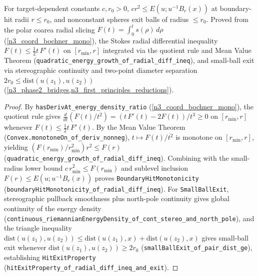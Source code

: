 \begin{theorem}
\label{cert_hit}
\leanok
{}
For target-dependent constants $c,r_0>0$, $cr^2\le E(u;u^{-1}B_r(x))$ at boundary-hit radii $r\le r_0$,
and nonconstant spheres exit balls of radius $\le r_0$. Proved from the polar coarea radial slicing
$F(t)=\int_0^t s(\rho)\,d\rho$ (\cref{n3_coord_bochner_mono}), the Stokes radial differential inequality
$F(t)\le \tfrac12 t\,F'(t)$ on $[r_{\min},r]$ integrated via the quotient rule and Mean Value Theorem
(\texttt{quadratic\_energy\_growth\_of\_radial\_diff\_ineq}), and small-ball exit via stereographic
continuity and two-point diameter separation $2r_0\le \mathrm{dist}(u(z_1),u(z_2))$
(\cref{n3_phase2_bridges,n3_first_principles_reductions}).
\end{theorem}
\begin{proof}\leanok
By \texttt{hasDerivAt\_energy\_density\_ratio} (\cref{n3_coord_bochner_mono}), the quotient rule gives
$\frac{d}{dt}(F(t)/t^2) = (t\,F'(t) - 2F(t))/t^3 \ge 0$ on $[r_{\min},r]$ whenever
$F(t)\le \tfrac12 t\,F'(t)$. By the Mean Value Theorem (\texttt{Convex.monotoneOn\_of\_deriv\_nonneg}),
$t\mapsto F(t)/t^2$ is monotone on $[r_{\min},r]$, yielding $(F(r_{\min})/r_{\min}^2)r^2\le F(r)$
(\texttt{quadratic\_energy\_growth\_of\_radial\_diff\_ineq}). Combining with the small-radius lower bound
$c\,r_{\min}^2\le F(r_{\min})$ and sublevel inclusion $F(r)\le E(u;u^{-1}B_r(x))$ proves
\texttt{BoundaryHitMonotonicity} (\texttt{boundaryHitMonotonicity\_of\_radial\_diff\_ineq}). For
\texttt{SmallBallExit}, stereographic pullback smoothness plus north-pole continuity gives global continuity
of the energy density (\texttt{continuous\_riemannianEnergyDensity\_of\_cont\_stereo\_and\_north\_pole}),
and the triangle inequality $\mathrm{dist}(u(z_1),u(z_2))\le \mathrm{dist}(u(z_1),x)+\mathrm{dist}(u(z_2),x)$
gives small-ball exit whenever $\mathrm{dist}(u(z_1),u(z_2))\ge 2r_0$ (\texttt{smallBallExit\_of\_pair\_dist\_ge}),
establishing \texttt{HitExitProperty} (\texttt{hitExitProperty\_of\_radial\_diff\_ineq\_and\_exit}).\end{proof}

